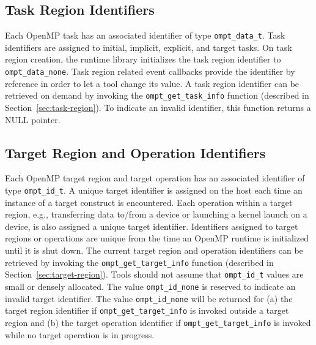 \documentclass{article}
\begin{document}
  \subsection{Task Region Identifiers}
  Each OpenMP task has an associated identifier of type \verb|ompt_data_t|. 
  Task identifiers are assigned to initial, implicit, explicit, and target tasks.
  On task region creation, the runtime library initializes the task region identifier to \verb|ompt_data_none|.
  Task region related event callbacks provide the identifier by reference in order to let a tool change its value.
  A task region identifier can be retrieved on demand by invoking the \verb|ompt_get_task_info| function (described in Section~\ref{sec:task-region}).
  To indicate an invalid identifier, this function returns a NULL pointer.
  
\subsection{Target Region and Operation Identifiers}
Each OpenMP target region and target operation has an associated identifier of type \verb|ompt_id_t|. 
A unique target identifier is assigned on the host each time an instance of a target construct is encountered.
Each operation within a target region, e.g., transferring data to/from a device or launching a kernel launch 
on a device, is also assigned a unique target identifier. 
Identifiers assigned to target regions or operations 
are unique from the time an OpenMP runtime is initialized until it is shut down. 
The current target region and operation identifiers can be retrieved by invoking the \verb|ompt_get_target_info| function (described in Section~\ref{sec:target-region}).
Tools should not assume that \verb|ompt_id_t| values are small or densely allocated. 
The value \verb|ompt_id_none| is reserved to indicate an invalid target identifier. 
The value \verb|ompt_id_none| will be returned for (a) the target region identifier if \verb|ompt_get_target_info| is invoked outside a target region and (b) the target operation identifier if \verb|ompt_get_target_info| is invoked while no target operation is in progress.
\end{document}
